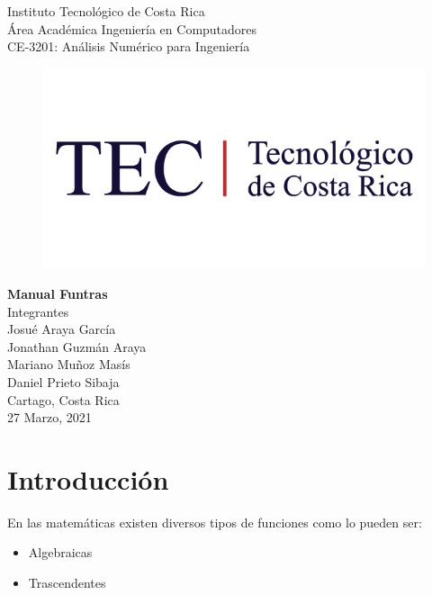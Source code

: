 \documentclass[10pt,a4paper]{article}
\author{Jonathan G Araya}
\begin{document}
	\begin{center}
		\LARGE Instituto Tecnológico de Costa Rica \\
		\LARGE Área Académica Ingeniería en Computadores \\
		\LARGE CE-3201: Análisis Numérico para Ingeniería \\
	\end{center}

	\begin{figure}[h]
		\centering
		\includegraphics[scale = 0.5]{img/TEC.png}
	\end{figure}

	\begin{center}
		\huge \textbf{Manual Funtras} \\
		\vspace{20mm}
		\LARGE Integrantes \\
		\vspace{5mm}
		\large Josué Araya García \\
		\large Jonathan Guzmán Araya \\	
		\large Mariano Muñoz Masís \\
		\large Daniel Prieto Sibaja \\
		\vspace{5cm}
		Cartago, Costa Rica \\
		27 Marzo, 2021
	\end{center}

	\tableofcontents
	
	\section{Introducción}
	
	En las matemáticas existen diversos tipos de funciones como lo pueden ser:
	\begin{itemize}
		\item Algebraicas
		\item Trascendentes
	\end{itemize}
\end{document}
